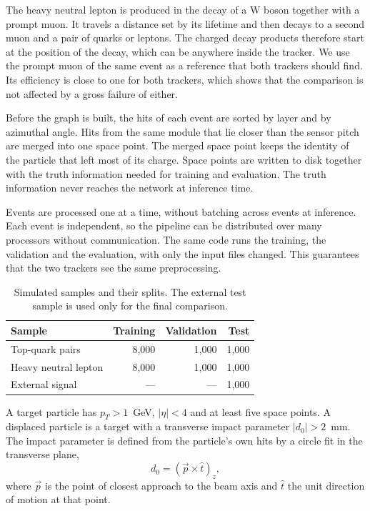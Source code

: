 The heavy neutral lepton is produced in the decay of a W boson together with a prompt muon. It travels a distance set by its lifetime and then decays to a second muon and a pair of quarks or leptons. The charged decay products therefore start at the position of the decay, which can be anywhere inside the tracker. We use the prompt muon of the same event as a reference that both trackers should find. Its efficiency is close to one for both trackers, which shows that the comparison is not affected by a gross failure of either.

Before the graph is built, the hits of each event are sorted by layer and by azimuthal angle. Hits from the same module that lie closer than the sensor pitch are merged into one space point. The merged space point keeps the identity of the particle that left most of its charge. Space points are written to disk together with the truth information needed for training and evaluation. The truth information never reaches the network at inference time.

Events are processed one at a time, without batching across events at inference. Each event is independent, so the pipeline can be distributed over many processors without communication. The same code runs the training, the validation and the evaluation, with only the input files changed. This guarantees that the two trackers see the same preprocessing.

\begin{table}[tbp]
  \caption{Simulated samples and their splits. The external test sample is used only for the final comparison.}
  \label{tab:samples}
  \centering
  \begin{tabular}{lrrr}
    \hline\hline
    Sample & Training & Validation & Test \\
    \hline
    Top-quark pairs & 8,000 & 1,000 & 1,000 \\
    Heavy neutral lepton & 8,000 & 1,000 & 1,000 \\
    External signal & --- & --- & 1,000 \\
    \hline\hline
  \end{tabular}
\end{table}

A target particle has $p_T > 1$~GeV, $|\eta| < 4$ and at least five space points. A displaced particle is a target with a transverse impact parameter $|d_0| > 2$~mm. The impact parameter is defined from the particle's own hits by a circle fit in the transverse plane,
\begin{equation}
  d_0 = \left(\vec{p} \times \hat{t}\right)_z ,
  \label{eq:d0}
\end{equation}
where $\vec{p}$ is the point of closest approach to the beam axis and $\hat{t}$ the unit direction of motion at that point.


